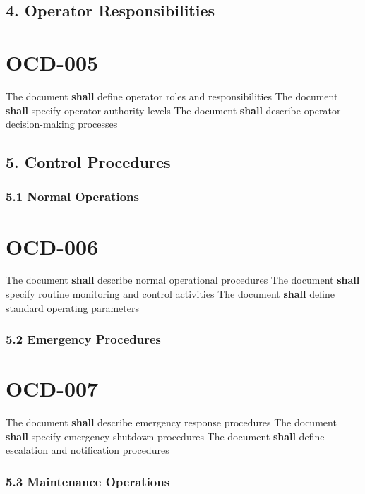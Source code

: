 \subsection{4. Operator Responsibilities}

\section{OCD-005}\label{OCD-005}

The document \textbf{shall} define operator roles and responsibilities
The document \textbf{shall} specify operator authority levels
The document \textbf{shall} describe operator decision-making processes

\subsection{5. Control Procedures}

\subsubsection{5.1 Normal Operations}

\section{OCD-006}\label{OCD-006}

The document \textbf{shall} describe normal operational procedures
The document \textbf{shall} specify routine monitoring and control activities
The document \textbf{shall} define standard operating parameters

\subsubsection{5.2 Emergency Procedures}

\section{OCD-007}\label{OCD-007}

The document \textbf{shall} describe emergency response procedures
The document \textbf{shall} specify emergency shutdown procedures
The document \textbf{shall} define escalation and notification procedures

\subsubsection{5.3 Maintenance Operations}

